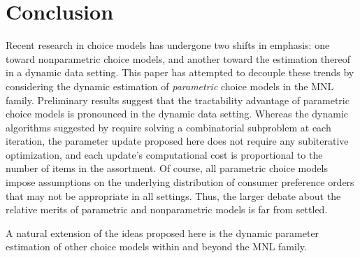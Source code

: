 \documentclass[preprint,12pt,authoryear]{elsarticle}
\begin{document}
\section{Conclusion}
Recent research in choice models has undergone two shifts in emphasis: one toward nonparametric choice models, and another toward the estimation thereof in a dynamic data setting. This paper has attempted to decouple these trends by considering the dynamic estimation of \emph{parametric} choice models in the MNL family.  Preliminary results suggest that the tractability advantage of parametric choice models is pronounced in the dynamic data setting. Whereas the dynamic algorithms suggested by \cite{honguyen2021} require solving a combinatorial subproblem at each iteration, the parameter update proposed here does not require any subiterative optimization, and each update's computational cost is proportional to the number of items in the assortment. Of course, all parametric choice models impose assumptions on the underlying distribution of consumer preference orders that may not be appropriate in all settings. Thus, the larger debate about the relative merits of parametric and nonparametric models is far from settled.

A natural extension of the ideas proposed here is the dynamic parameter estimation of other choice models within and beyond the MNL family.




\end{document}
